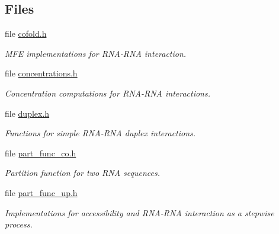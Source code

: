 \subsection*{Files}
\begin{DoxyCompactItemize}
\item 
file \mbox{\hyperlink{cofold_8h}{cofold.\+h}}
\begin{DoxyCompactList}\small\item\em M\+FE implementations for R\+N\+A-\/\+R\+NA interaction. \end{DoxyCompactList}\item 
file \mbox{\hyperlink{concentrations_8h}{concentrations.\+h}}
\begin{DoxyCompactList}\small\item\em Concentration computations for R\+N\+A-\/\+R\+NA interactions. \end{DoxyCompactList}\item 
file \mbox{\hyperlink{duplex_8h}{duplex.\+h}}
\begin{DoxyCompactList}\small\item\em Functions for simple R\+N\+A-\/\+R\+NA duplex interactions. \end{DoxyCompactList}\item 
file \mbox{\hyperlink{part__func__co_8h}{part\+\_\+func\+\_\+co.\+h}}
\begin{DoxyCompactList}\small\item\em Partition function for two R\+NA sequences. \end{DoxyCompactList}\item 
file \mbox{\hyperlink{part__func__up_8h}{part\+\_\+func\+\_\+up.\+h}}
\begin{DoxyCompactList}\small\item\em Implementations for accessibility and R\+N\+A-\/\+R\+NA interaction as a stepwise process. \end{DoxyCompactList}\end{DoxyCompactItemize}
